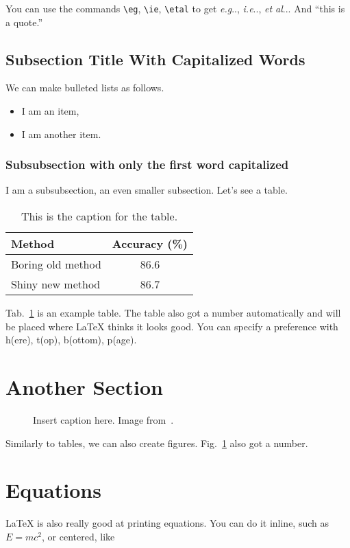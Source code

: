 \documentclass[twoside,a4paper,article]{combine}
\makeatletter
\DeclareRobustCommand\onedot{\futurelet\@let@token\@onedot}
\def\@onedot{\ifx\@let@token.\else.\null\fi\xspace}
\def\eg{\emph{e.g}\onedot} \def\Eg{\emph{E.g}\onedot}
\def\ie{\emph{i.e}\onedot} \def\Ie{\emph{I.e}\onedot}
\def\etal{\emph{et al}\onedot}
\makeatother
\begin{document}
You can use the commands \verb+\eg+,  \verb+\ie+,  \verb+\etal+ to get \eg, \ie, \etal. And ``this is a quote.''

\subsection{Subsection Title With Capitalized Words}
We can make bulleted lists as follows.

\begin{itemize}
\item I am an item,
\item I am another item.
\end{itemize}

\subsubsection{Subsubsection with only the first word capitalized}
I am a subsubsection, an even smaller subsection. Let's see a table.

\begin{table}[h]
\centering
\begin{tabular}{lc}
\toprule
Method & Accuracy (\%) \\
\midrule
Boring old method & 86.6 \\
Shiny new method & 86.7 \\
\bottomrule
\end{tabular}
\caption{This is the caption for the table.}
\label{tab:mytable}
\end{table}

Tab.~\ref{tab:mytable} is an example table. The table also got a number automatically and will be placed where LaTeX thinks it looks good. You can specify a preference with h(ere), t(op), b(ottom), p(age).

\section{Another Section}
\label{sec:another}

\begin{figure}[h]
\centering
\caption{Insert caption here. Image from~\cite{Deng09CVPR}.}
\label{fig:example_figure}
\end{figure}

Similarly to tables, we can also create figures. Fig.~\ref{fig:example_figure} also got a number.

\section{Equations}
LaTeX is also really good at printing equations. You can do it inline, such as $E=mc^2$, or centered, like
\end{document}
